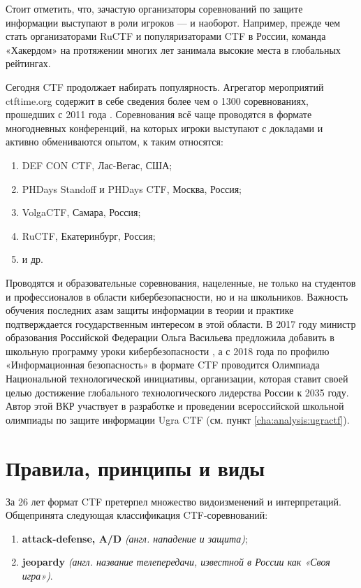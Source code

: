 Стоит отметить, что, зачастую организаторы соревнований по защите информации выступают в роли игроков --- и наоборот. Например, прежде чем стать организаторами RuCTF и популяризаторами CTF в России, команда «Хакердом» на протяжении многих лет занимала высокие места в глобальных рейтингах\cite{HackerdomRating}.

Сегодня CTF продолжает набирать популярность. Агрегатор мероприятий ctftime.org содержит в себе сведения более чем о 1300 соревнованиях, прошедших с 2011 года \cite{CTFTimeTotal}. Соревнования всё чаще проводятся в формате многодневных конференций, на которых игроки выступают с докладами и активно обмениваются опытом, к таким относятся:
\begin{enumerate}
  \item DEF CON CTF, Лас-Вегас, США;
  \item PHDays Standoff и PHDays CTF, Москва, Россия;
  \item VolgaCTF, Самара, Россия;
  \item RuCTF, Екатеринбург, Россия;
  \item и др.
\end{enumerate}

Проводятся и образовательные соревнования, нацеленные, не только на студентов и профессионалов в области кибербезопасности, но и на школьников. Важность обучения последних азам защиты информации в теории и практике подтверждается государственным интересом в этой области. В 2017 году министр образования Российской Федерации Ольга Васильева предложила добавить в школьную программу уроки кибербезопасности \cite{RG17}, а с 2018 года по профилю «Информационная безопасность» в формате CTF проводится Олимпиада Национальной технологической инициативы, организации, которая ставит своей целью достижение глобального технологического лидерства России к 2035 году. Автор этой ВКР участвует в разработке и проведении всероссийской школьной олимпиады по защите информации Ugra CTF (см. пункт \ref{cha:analysis:ugractf}).



\section{Правила, принципы и виды}

За 26 лет формат CTF претерпел множество видоизменений и интерпретаций. Общепринята следующая классификация CTF-соревнований:

\begin{enumerate}
  \item \textbf{attack-defense, A/D} \textit{(англ. нападение и защита)};
  \item \textbf{jeopardy} \textit{(англ. название телепередачи, известной в России как «Своя игра»)}.
\end{enumerate}

